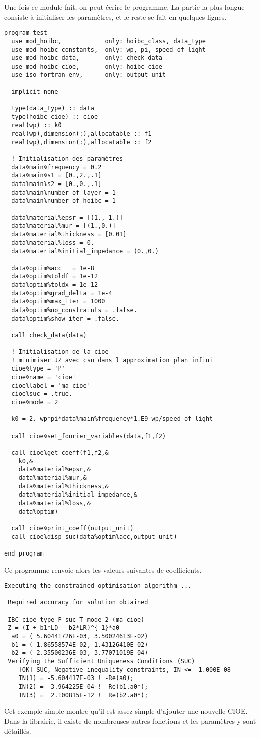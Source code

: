 Une fois ce module fait, on peut écrire le programme. La partie la plus longue consiste à initialiser les paramètres, et le reste se fait en quelques lignes.
\begin{lstlisting}
program test
  use mod_hoibc,            only: hoibc_class, data_type
  use mod_hoibc_constants,  only: wp, pi, speed_of_light
  use mod_hoibc_data,       only: check_data
  use mod_hoibc_cioe,       only: hoibc_cioe
  use iso_fortran_env,      only: output_unit

  implicit none

  type(data_type) :: data
  type(hoibc_cioe) :: cioe
  real(wp) :: k0
  real(wp),dimension(:),allocatable :: f1
  real(wp),dimension(:),allocatable :: f2

  ! Initialisation des paramètres
  data%main%frequency = 0.2
  data%main%s1 = [0.,2.,.1]
  data%main%s2 = [0.,0.,.1]
  data%main%number_of_layer = 1
  data%main%number_of_hoibc = 1

  data%material%epsr = [(1.,-1.)]
  data%material%mur = [(1.,0.)]
  data%material%thickness = [0.01]
  data%material%loss = 0.
  data%material%initial_impedance = (0.,0.)

  data%optim%acc   = 1e-8
  data%optim%toldf = 1e-12
  data%optim%toldx = 1e-12
  data%optim%grad_delta = 1e-4
  data%optim%max_iter = 1000
  data%optim%no_constraints = .false.
  data%optim%show_iter = .false.

  call check_data(data)

  ! Initialisation de la cioe
  ! minimiser JZ avec csu dans l'approximation plan infini
  cioe%type = 'P'
  cioe%name = 'cioe'
  cioe%label = 'ma_cioe'
  cioe%suc = .true.
  cioe%mode = 2

  k0 = 2._wp*pi*data%main%frequency*1.E9_wp/speed_of_light

  call cioe%set_fourier_variables(data,f1,f2)

  call cioe%get_coeff(f1,f2,& 
    k0,&
    data%material%epsr,&
    data%material%mur,&
    data%material%thickness,&
    data%material%initial_impedance,&
    data%material%loss,&
    data%optim)

  call cioe%print_coeff(output_unit)
  call cioe%disp_suc(data%optim%acc,output_unit)

end program
\end{lstlisting}

Ce programme renvoie alors les valeurs suivantes de coefficients.

\begin{lstlisting}[style=shell]
 Executing the constrained optimisation algorithm ...

 Required accuracy for solution obtained

 IBC cioe type P suc T mode 2 (ma_cioe)
 Z = (I + b1*LD - b2*LR)^{-1}*a0
  a0 = ( 5.60441726E-03, 3.50024613E-02)
  b1 = ( 1.86558574E-02,-1.43126410E-02)
  b2 = ( 2.35500236E-03,-3.77071019E-04)
 Verifying the Sufficient Uniqueness Conditions (SUC)
    [OK] SUC, Negative inequality constraints, IN <=  1.000E-08
    IN(1) = -5.604417E-03 ! -Re(a0);
    IN(2) = -3.964225E-04 !  Re(b1.a0*);
    IN(3) =  2.100815E-12 !  Re(b2.a0*);
\end{lstlisting}

Cet exemple simple montre qu'il est assez simple d'ajouter une nouvelle CIOE. Dans la librairie, il existe de nombreuses autres fonctions et les paramètres y sont détaillés.